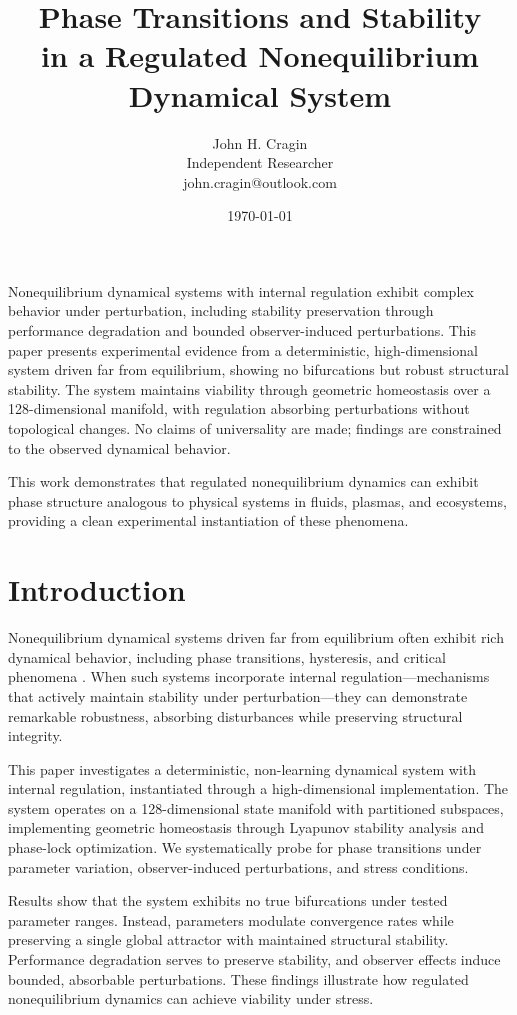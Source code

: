 \documentclass[12pt,a4paper]{article}
\title{Phase Transitions and Stability \\
\large in a Regulated Nonequilibrium Dynamical System}
\author{John H. Cragin \\
Independent Researcher \\
john.cragin@outlook.com}
\date{\today}
\begin{document}
\maketitle

Nonequilibrium dynamical systems with internal regulation exhibit complex behavior under perturbation, including stability preservation through performance degradation and bounded observer-induced perturbations. This paper presents experimental evidence from a deterministic, high-dimensional system driven far from equilibrium, showing no bifurcations but robust structural stability. The system maintains viability through geometric homeostasis over a 128-dimensional manifold, with regulation absorbing perturbations without topological changes. No claims of universality are made; findings are constrained to the observed dynamical behavior.

This work demonstrates that regulated nonequilibrium dynamics can exhibit phase structure analogous to physical systems in fluids, plasmas, and ecosystems, providing a clean experimental instantiation of these phenomena.

\section{Introduction}

Nonequilibrium dynamical systems driven far from equilibrium often exhibit rich dynamical behavior, including phase transitions, hysteresis, and critical phenomena \cite{prigogine1977self}. When such systems incorporate internal regulation—mechanisms that actively maintain stability under perturbation—they can demonstrate remarkable robustness, absorbing disturbances while preserving structural integrity.

This paper investigates a deterministic, non-learning dynamical system with internal regulation, instantiated through a high-dimensional implementation. The system operates on a 128-dimensional state manifold with partitioned subspaces, implementing geometric homeostasis through Lyapunov stability analysis and phase-lock optimization. We systematically probe for phase transitions under parameter variation, observer-induced perturbations, and stress conditions.

Results show that the system exhibits no true bifurcations under tested parameter ranges. Instead, parameters modulate convergence rates while preserving a single global attractor with maintained structural stability. Performance degradation serves to preserve stability, and observer effects induce bounded, absorbable perturbations. These findings illustrate how regulated nonequilibrium dynamics can achieve viability under stress.
\end{document}
